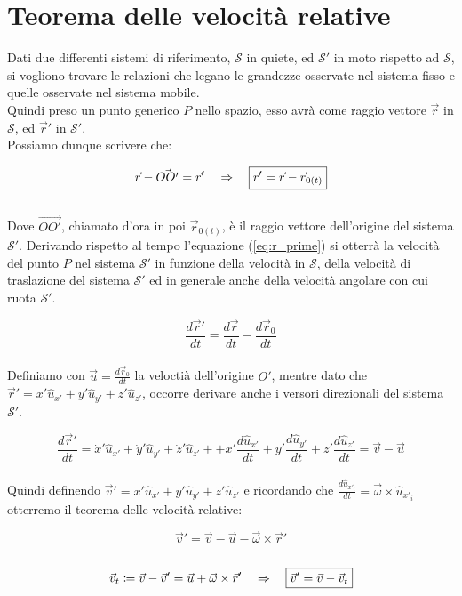 \section{Teorema delle velocità relative}

Dati due differenti sistemi di riferimento,  $\mathcal{S}$ in quiete, ed
$\mathcal{S'}$ in moto rispetto ad  $\mathcal{S}$, si vogliono trovare le
relazioni che legano le grandezze osservate nel sistema fisso e quelle
osservate nel sistema mobile.\\
Quindi preso un punto generico $P$ nello spazio, esso avrà come raggio
vettore $\vec r$ in  $\mathcal{S}$, ed $\vec r'$ in  $\mathcal{S'}$.
\\Possiamo dunque scrivere che:

\begin{equation}
    \vec r - \vec{OO'} = \vec r' \quad\Rightarrow\quad \boxed{ \vec r' = \vec r - \vec r_{0(t)}}
\label{eq:r_prime}
\end{equation}
\\
Dove $\vec{OO'}$, chiamato d'ora in poi $\vec r_{0(t)}$, è il raggio vettore
dell'origine del sistema $\mathcal{S'}$.
Derivando rispetto al tempo l'equazione (\ref{eq:r_prime}) si otterrà la
velocità del punto $P$ nel sistema $\mathcal{S'}$ in funzione della velocità
in $\mathcal{S}$, della velocità di traslazione del sistema $\mathcal{S'}$
ed in generale anche della velocità angolare con cui ruota $\mathcal{S'}$.

\begin{equation}
    \frac{d\vec r'}{dt} = \frac{d\vec r}{dt} - \frac{d\vec r_0}{dt}
\end{equation}
\\
Definiamo con $\vec u = \frac{d\vec r_0}{dt}$ la veloctià dell'origine $O'$,
mentre dato che $\vec r' = x'\hat u_{x'} + y'\hat u_{y'} + z'\hat u_{z'}$,
occorre derivare anche i versori direzionali del sistema $\mathcal{S'}$.

\begin{equation}
    \frac{d\vec r'}{dt} = \dot x'\hat u_{x'}+\dot y'\hat u_{y'}+\dot z'\hat u_{z'}+
    + x'\frac{d\hat u_{x'}}{dt}+ y'\frac{d\hat u_{y'}}{dt}+ z'\frac{d\hat u_{z'}}{dt}
    =\vec v-\vec u
\end{equation}
\\
Quindi definendo $\vec v' = \dot x'\hat u_{x'}+\dot y'\hat u_{y'}+
\dot z'\hat u_{z'}$ e ricordando che $\frac{d\hat u_{x'_i}}{dt} =
\vec\omega\times\hat u_{x'_i}$ otterremo il teorema delle velocità relative:

\begin{equation}
    \boxed{\vec v' = \vec v - \vec u - \vec \omega\times\vec r'}
\end{equation}
\\
\begin{equation}
    \vec v_t \coloneqq \vec v - \vec v' = \vec u + \vec \omega\times\vec r'
    \quad\Rightarrow\quad \boxed{\vec v' = \vec v - \vec v_t}
\end{equation}